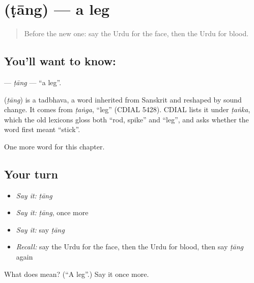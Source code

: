 \section[\texorpdfstring{\ur{ٹانگ} (ṭāng)}{ٹانگ (ṭāng)}]{ (ṭāng) — a leg}

\label{lesson:UR-C40-tang}



\begin{quote}
Before the new one: say the Urdu for the face, then the Urdu for blood.
\end{quote}

\subsection*{You'll want to know: }
\textbf{} — \emph{ṭāng} — \textquotedblleft{}a leg\textquotedblright{}.

\begin{cousinweb}
\textbf{} (\emph{ṭāng}) is a tadbhava, a word inherited from Sanskrit and reshaped by sound change. It comes from \emph{ṭaṅga}, \textquotedblleft{}leg\textquotedblright{} (CDIAL 5428). CDIAL lists it under \emph{ṭaṅka}, which the old lexicons gloss both \textquotedblleft{}rod, spike\textquotedblright{} and \textquotedblleft{}leg\textquotedblright{}, and asks whether the word first meant \textquotedblleft{}stick\textquotedblright{}.
\end{cousinweb}

\begin{grammarlens}[title={What you've built}]
One more word for this chapter.
\end{grammarlens}

\subsection*{Your turn}
\begin{itemize}
\raggedright
  \item \emph{Say it:} \emph{ṭāng}
  \item \emph{Say it:} \emph{ṭāng}, once more
  \item \emph{Say it:} say \emph{ṭāng}
  \item \emph{Recall:} say the Urdu for the face, then the Urdu for blood, then say \emph{ṭāng} again
\end{itemize}

\begin{tcolorbox}[breakable,colback=teal!4,colframe=teal!35!black,title={Before you move on}]
What does  mean? (\textquotedblleft{}A leg\textquotedblright{}.) Say it once more.
\end{tcolorbox}
